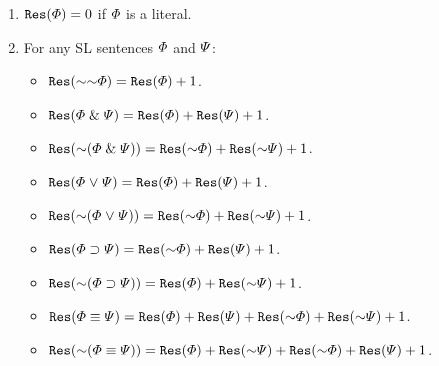 \begin{enumerate}
  \item $\texttt{Res}(\varPhi)=0$ if $\varPhi$ is a literal.
  \item For any SL sentences $\varPhi$ and $\varPsi$:
    \begin{itemize}
      \item $\res(\enot\enot\metaA)=\res(\metaA)+1$.
      \item $\texttt{Res}(\varPhi \mathrel\& \varPsi)=\texttt{Res}(\varPhi)+\texttt{Res}(\varPsi)+1$.
      \item $\res(\enot(\metaA \eand \metaB))=\res(\enot\metaA)+\res(\enot\metaB)+1$.
      \item $\texttt{Res}(\varPhi \mkern1mu\vee\mkern1mu \varPsi)=\texttt{Res}(\varPhi)+\texttt{Res}(\varPsi)+1$.
      \item $\res(\enot(\metaA \eor \metaB))=\res(\enot\metaA)+\res(\enot\metaB)+1$.
      \item $\res(\metaA \eif \metaB)=\res(\enot\metaA)+\res(\metaB)+1$.
      \item $\res(\enot(\metaA \eif \metaB))=\res(\metaA)+\res(\enot\metaB)+1$.
      \item $\res(\metaA \eiff \metaB)=\res(\metaA)+\res(\metaB) + \res(\enot\metaA)+\res(\enot\metaB)+1$.
      \item $\res(\enot(\metaA \eiff \metaB))=\res(\metaA) + \res(\enot\metaB) + \res(\enot\metaA)+\res(\metaB)+1$.
    \end{itemize}
\end{enumerate}


